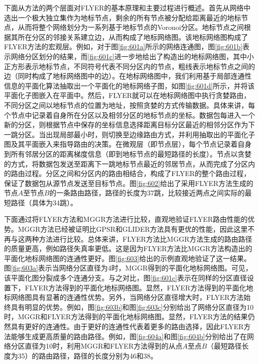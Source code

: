下面从方法的两个层面对FLYER的基本原理和主要过程进行概述。首先从网络中选出一个极大独立集作为地标节点，剩余的所有节点被分配给距离最近的地标节点，从而将整个网络划分为一系列基于地标节点的Voronoi分区。地标节点之间根据其所在分区的邻接关系建立边，从而构成了地标网络图。该地标网络图构成了FLYER方法的宏观层。例如，对于图\ref{fig:601a}所示的网络连通图，图\ref{fig:601b}表示网络分区划分的结果，而\ref{fig:601c}进一步地给出了构造出的地标网络图，其中小正方形表示地标节点，不同符号代表不同分区内的节点，粗线表示地标节点之间的边（同时构成了地标网络图中的边）。在地标网络图中，我们利用基于局部连通性信息的平面化算法抽取出一个平面化的地标网络子图，如图\ref{fig:601d}所示，并将该平面化子图嵌入在平面中。然后，FLYER就可以在地标网络图中执行贪婪路由，不同分区之间以地标节点的位置为地址，按照贪婪的方式传输数据。具体来讲，每个节点中记录着自身所在分区以及相邻分区的地标节点的坐标。数据包每进入一个新的分区，则根据节点中保存的坐标信息选择距离目标分区最近的相邻分区作为下一跳分区。当出现局部最小时，则切换至边缘路由方式，并利用抽取出的平面化子图及其平面嵌入来指导路由的决策。在微观层（即节点层），每个节点记录着自身到所有邻居分区的距离梯度信息（即到地标节点的最短路径的长度）。节点以贪婪的方式，将数据包发送至距离下一跳地标节点最近的邻居节点，从而完成了分区内的路由过程。分区之间和分区内的路由相结合，构成了FLYER的整个路由过程，保证了数据包从源节点发送至目标节点。图\ref{fig:602}给出了采用FLYER方法生成的节点$A$至节点$B$的一条路由路径，路径的长度为37跳，比较接近两点之间实际的最短路径（具体为34跳）。

下面通过将FLYER方法和MGGR方法进行比较，直观地验证FLYER路由性能的优势。MGGR方法已经被证明比GPSR和GLIDER方法具有更优的性能，因此这里不再与这两种方法进行比较。总体来讲，FLYER方法比MGGR方法生成的路由路径的质量更高，例如路径失真率更低。这是因为FLYER方法比MGGR方法构造出的平面化地标网络图的连通性更好。图\ref{fig:603}给出的示例直观地验证了这一结果。图\ref{fig:603a}表示当网络分区直径为4时，MGGR得到的平面化地标网络图。可见，该平面化图分裂成多个连通分支。与之对比，图\ref{fig:601c}表示在同样的分区直径设置下，FLYER方法得到的平面化地标网络图。显然，FLYER方法得到的平面化地标网络图具有显著的连通性优势。另外，当网络分区直径增大时，FLYER方法始终具有明显的优势。例如，图\ref{fig:603b}和图\ref{fig:603c}分别给出了网络分区直径为10时，MGGR和FLYER方法得到的平面化地标网络图。显然，FLYER方法的结果仍然具有更好的连通性。由于更好的连通性代表着更多的路由选择，因此FLYER方法能够生成更高质量的路由路径。例如，图\ref{fig:604a}和图\ref{fig:604b}分别给出了在网络分区直径为10时，利用MGGR和FLYER方法得到的从点$A$至点$B$（最短路径长度为35）的路由路径，路径的长度分别为46和38。

